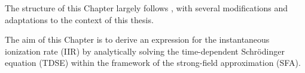 


The structure of this Chapter largely follows \cite{Ivanov20012005}, with several modifications and adaptations to the context of this thesis.

The aim of this Chapter is to derive an expression for the instantaneous ionization rate (IIR) by analytically solving the time-dependent Schrödinger equation (TDSE) within the framework of the strong-field approximation (SFA).

